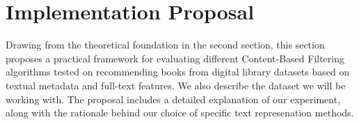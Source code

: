 \documentclass[\myFontSize,oneside,english,hidelinks,a4paper]{article}
\begin{document}
\clearpage
%
%




\section{Implementation Proposal}
Drawing from the theoretical foundation in the second section, this section proposes a practical framework for evaluating different Content-Based Filtering algorithms tested on recommending books from digital library datasets based on textual metadata and full-text features. We also describe the dataset we will be working with. The proposal includes a detailed explanation of our experiment, along with the rationale behind our choice of specific text represenation methods.\\ 
%
\end{document}
